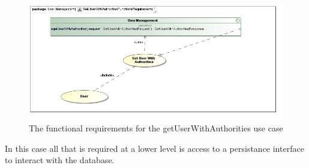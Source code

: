 \begin{figure}[H]
	\begin{center}
		\includegraphics[scale=0.5]{../Diagrams and Charts/Users/GetUserWithAuthoritiesFunctionalRequirements.jpg}
		\caption{The functional requirements for the getUserWithAuthorities use case}
		\label{getUserWithAuthoritiesFR}
	\end{center}	
\end{figure}

In this case all that is required at a lower level is access to a persistance
interface to interact with the database.
